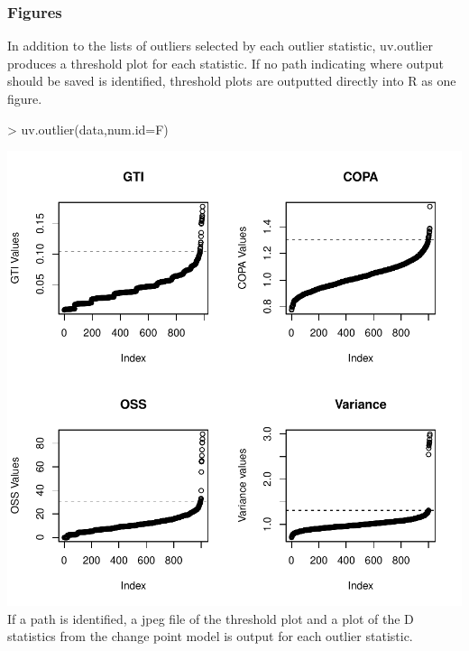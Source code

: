 \documentclass[11pt, a4paper]{article}
\begin{document}
\subsubsection{Figures}
In addition to the lists of outliers selected by each outlier statistic, uv.outlier produces a threshold plot for each statistic. If no path indicating where output should be saved is identified, threshold plots are outputted directly into R as one figure. 
\begin{Schunk}
\begin{Sinput}
> uv.outlier(data,num.id=F)
\end{Sinput}
\end{Schunk}
\includegraphics{roapkg-008}
If a path is identified, a jpeg file of the threshold plot and a plot of the D statistics from the change point model \cite{cpm} is output for each outlier statistic.
\end{document}
